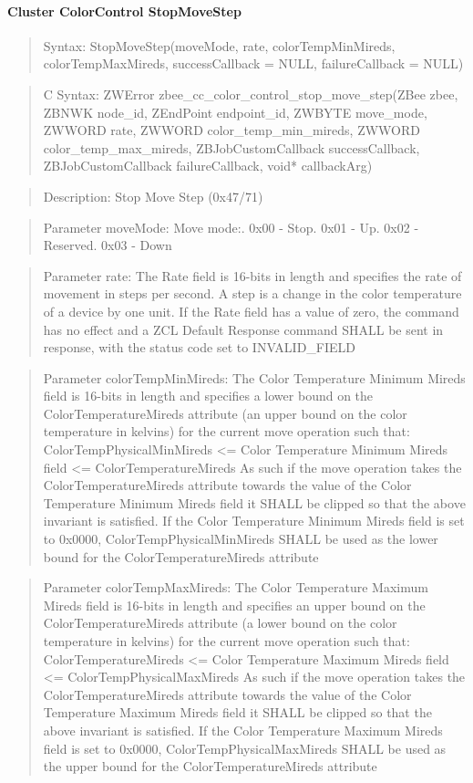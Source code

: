 \paragraph{Cluster ColorControl StopMoveStep}
\begin{quote}Syntax: StopMoveStep(moveMode, rate, colorTempMinMireds, colorTempMaxMireds, successCallback = NULL, failureCallback = NULL)\end{quote}
\begin{quote}C Syntax: ZWError zbee\_cc\_color\_control\_stop\_move\_step(ZBee zbee, ZBNWK node\_id, ZEndPoint endpoint\_id, ZWBYTE move\_mode, ZWWORD rate, ZWWORD color\_temp\_min\_mireds, ZWWORD color\_temp\_max\_mireds, ZBJobCustomCallback successCallback, ZBJobCustomCallback failureCallback, void* callbackArg)\end{quote}
\begin{quote}Description: Stop Move Step (0x47/71)\end{quote}
\begin{quote}Parameter moveMode: Move mode:. 0x00 - Stop. 0x01 - Up. 0x02 - Reserved. 0x03 - Down\end{quote}
\begin{quote}Parameter rate: The Rate field is 16-bits in length and specifies the rate of movement in steps per second. A step is a change in the color temperature of a device by one unit. If the Rate field has a value of zero, the command has no effect and a ZCL Default Response command SHALL be sent in response, with the status code set to INVALID\_FIELD\end{quote}
\begin{quote}Parameter colorTempMinMireds: The Color Temperature Minimum Mireds field is 16-bits in length and specifies a lower bound on the ColorTemperatureMireds attribute (an upper bound on the color temperature in kelvins) for the current move operation such that: ColorTempPhysicalMinMireds <= Color Temperature Minimum Mireds field <= ColorTemperatureMireds As such if the move operation takes the ColorTemperatureMireds attribute towards the value of the Color Temperature Minimum Mireds field it SHALL be clipped so that the above invariant is satisfied. If the Color Temperature Minimum Mireds field is set to 0x0000, ColorTempPhysicalMinMireds SHALL be used as the lower bound for the ColorTemperatureMireds attribute\end{quote}
\begin{quote}Parameter colorTempMaxMireds: The Color Temperature Maximum Mireds field is 16-bits in length and specifies an upper bound on the ColorTemperatureMireds attribute (a lower bound on the color temperature in kelvins) for the current move operation such that: ColorTemperatureMireds <= Color Temperature Maximum Mireds field <= ColorTempPhysicalMaxMireds As such if the move operation takes the ColorTemperatureMireds attribute towards the value of the Color Temperature Maximum Mireds field it SHALL be clipped so that the above invariant is satisfied. If the Color Temperature Maximum Mireds field is set to 0x0000, ColorTempPhysicalMaxMireds SHALL be used as the upper bound for the ColorTemperatureMireds attribute\end{quote}
